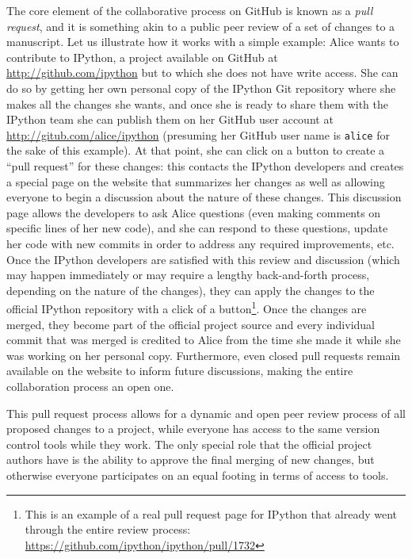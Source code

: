 \documentclass[ChapterTOCs,krantz2]{krantz} %
\begin{document}
The core element of the collaborative process on GitHub is known as a
\emph{pull request}, and it is something akin to a public peer review of a set
of changes to a manuscript.  Let us illustrate how it works with a simple
example: Alice wants to contribute to IPython, a project available on GitHub at
\url{http://github.com/ipython} but to which she does not have write access.
She can do so by getting her own personal copy of the IPython Git repository
where she makes all the changes she wants, and once she is ready to share them
with the IPython team she can publish them on her GitHub user account at
\url{http://gitub.com/alice/ipython} (presuming her GitHub user name is
\texttt{alice} for the sake of this example).  At that point, she can click on
a button to create a ``pull request'' for these changes: this contacts the
IPython developers and creates a special page on the website that summarizes
her changes as well as allowing everyone to begin a discussion about the nature
of these changes.  This discussion page allows the developers to ask Alice
questions (even making comments on specific lines of her new code), and she can
respond to these questions, update her code with new commits in order to
address any required improvements, etc.  Once the IPython developers are
satisfied with this review and discussion (which may happen immediately or may
require a lengthy back-and-forth process, depending on the nature of the
changes), they can apply the changes to the official IPython repository with a
click of a button\footnote{This is an example of a real pull request page for
  IPython that already went through the entire review process:
  \url{https://github.com/ipython/ipython/pull/1732}}.  Once the changes are
merged, they become part of the official project source and every individual
commit that was merged is credited to Alice from the time she made it while she
was working on her personal copy.  Furthermore, even closed pull requests
remain available on the website to inform future discussions, making the entire
collaboration process an open one.

This pull request process allows for a dynamic and open peer review process of
all proposed changes to a project, while everyone has access to the same
version control tools while they work.  The only special role that the official
project authors have is the ability to approve the final merging of new
changes, but otherwise everyone participates on an equal footing in terms of
access to tools.  
\end{document}
